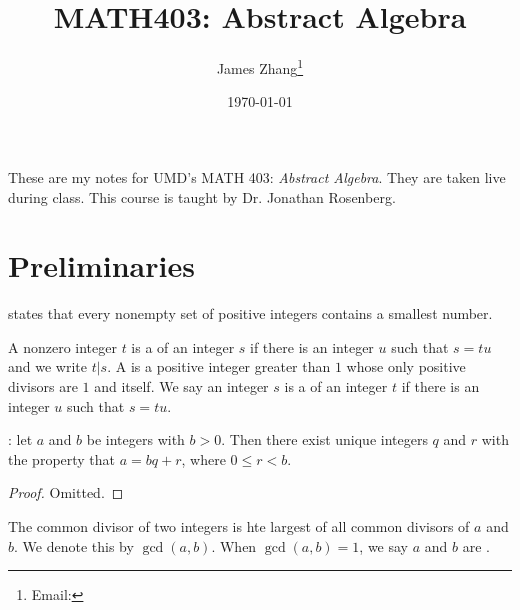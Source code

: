 \documentclass[12pt]{scrartcl}
\begin{document}
\title{MATH403: Abstract Algebra}
\author{James Zhang\thanks{Email: }}
\date{\today}



\maketitle
These are my notes for UMD's MATH 403: \textit{Abstract Algebra}. They are taken live during class. This course is taught by Dr. Jonathan Rosenberg.
\tableofcontents
\newpage

\section{Preliminaries}

\begin{theorem}
   states that every nonempty set of positive integers contains a
  smallest number. 
\end{theorem}

\begin{definition}
  A nonzero integer $t$ is a  of an integer $s$ if there is an integer $u$ such that 
  $s = tu$ and we write $t | s$. A  is a positive integer greater than $1$ whose only 
  positive divisors are $1$ and itself. We say an integer $s$ is a  of an integer $t$ if there is an integer $u$ such that 
  $s = tu$. 
\end{definition}

\begin{theorem}
  : let $a$ and $b$ be integers with $b > 0$. Then there exist unique integers $q$ and $r$ with the property that 
  $a = bq + r$, where $0 \leq r < b$. 
  \begin{proof}
    Omitted. 
  \end{proof}
\end{theorem}

\begin{definition}
  The  common divisor of two integers is hte largest of all common divisors of $a$ and $b$. 
  We denote this by $\gcd(a, b)$. When $\gcd(a, b) = 1$, we say $a$ and $b$ are . 
\end{definition}
\end{document}
